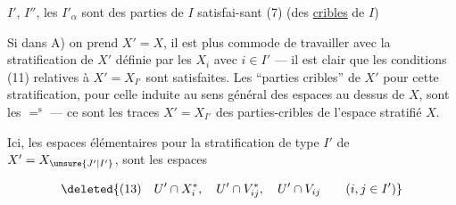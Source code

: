 $I'$, $I''$, les $I'_\alpha$ sont des parties de $I$ satisfai-\linebreak sant (7) (des \uline{cribles} de $I$)

Si dans A) on prend $X'=X$, il est plus commode de travailler avec la stratification de $X'$ définie par les $X_i$ avec $i\in I'$ --- il est clair que les conditions (11) relatives à $X'=X_{I'}$ sont satisfaites. Les ``parties cribles'' de $X'$ pour cette stratification,  pour celle induite au sens général des espaces au dessus de $X$, sont les $=^{\mathrm s}$ --- ce sont  les traces   $X'=X_{I'}$ des parties-cribles de l'espace stratifié $X$.

Ici, les espaces élémentaires pour la stratification de type $I'$ de  $X'=X_{\unsure{J'|I'}}$, sont les espaces

\[
\deleted{(13)\quad U'\cap X_i^*,\quad U'\cap V_{ij}^*,\quad U'\cap V_{ij}\qquad(i,j\in I')}
\]

